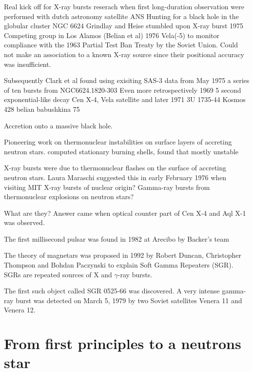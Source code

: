 Real kick off for X-ray bursts reserach when first long-duration observation were performed with dutch astronomy satellite ANS
Hunting for a black hole in the globular cluster NGC 6624 Grindlay and Heise stumbled upon X-ray burst 1975 \cite{GH75} \cite{GGS76}
Competing group in Los Alamos (Belian et al) 1976\cite{BCE76}
Vela(-5) to monitor compliance with the 1963 Partial Test Ban Treaty by the Soviet Union. Could not make an association to a known X-ray source since their positional accuracy was insufficient.


Subsequently Clark et al found using exisiting SAS-3 data from May 1975 a series of ten bursts from NGC6624.1820-303 \cite{CJB76}
Even more retrospectively
1969 \cite{BCE72} 5 second exponential-like decay Cen X-4, Vela satellite  and later 1971 \cite{BKM75} 3U 1735-44 Kosmos 428  
belian \cite{BCE72}
babushkina 75\cite{BKM75}

Accretion onto a massive black hole.


Pioneering work on thermonuclear instabilities on surface layers of accreting neutron stars. \cite{HvH75}
computed stationary burning shells, found that mostly unstable

X-ray bursts were due to thermonuclear flashes on the surface of accreting neutron stars.
Laura Maraschi suggested this in early February 1976 when visiting MIT 
X-ray bursts of nuclear origin? \cite{MC77}
Gamma-ray bursts from thermonuclear explosions on neutron stars? \cite{WT76}



What are they? Answer came when optical counter part of Cen X-4 \cite{vPV80} and Aql X-1 \cite{TCB78} was observed.



The first millisecond pulsar was found in 1982 at Arecibo by Backer’s team

The theory of magnetars was proposed in 1992 by Robert Duncan, Christopher Thompson and Bohdan Paczynski to explain Soft Gamma Repeaters (SGR). SGRs are repeated sources of X and $\gamma$-ray bursts. \cite{DT92}

The first such object called SGR 0525-66 was discovered.
A very intense gamma-ray burst was detected on March 5, 1979 by two Soviet satellites Venera 11 and Venera 12.\cite{MGI79}



\section{From first principles to a neutrons star}

